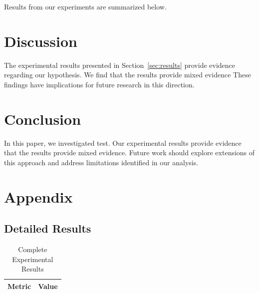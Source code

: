 \documentclass{article}
\begin{document}
Results from our experiments are summarized below.

\section{Discussion}

The experimental results presented in Section~\ref{sec:results} provide evidence regarding our hypothesis. We find that the results provide mixed evidence These findings have implications for future research in this direction.

\section{Conclusion}

In this paper, we investigated test. Our experimental results provide evidence that the results provide mixed evidence. Future work should explore extensions of this approach and address limitations identified in our analysis.

\appendix

\section{Appendix}

\subsection{Detailed Results}

\begin{table}[htbp]
\centering
\caption{Complete Experimental Results}
\begin{tabular}{lc}
\toprule
Metric & Value \\
\midrule
\bottomrule
\end{tabular}
\end{table}




\end{document}
